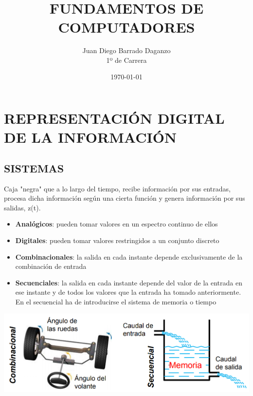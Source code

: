 \documentclass[a4paper,10pt]{book}
\title{FUNDAMENTOS DE COMPUTADORES}
\author{Juan Diego Barrado Daganzo\\1º de Carrera} %
\date{\today}
\begin{document}
\maketitle

\mainmatter
\chapter*{REPRESENTACIÓN DIGITAL DE LA INFORMACIÓN}
\section*{SISTEMAS}
Caja "negra" que a lo largo del tiempo, recibe información por sus entradas, procesa dicha información según una cierta función y genera información por sus salidas, z(t).

\begin{itemize}
\item \textbf{Analógicos}: pueden tomar valores en un espectro continuo de ellos
\item \textbf{Digitales}: pueden tomar valores restringidos a un conjunto discreto
\end{itemize}
\vspace{0.05cm}
\begin{itemize}
\item \textbf{Combinacionales}: la salida en cada instante depende exclusivamente de la combinación de entrada
\item \textbf{Secuenciales}: la salida en cada instante depende del valor de la entrada en ese instante y de todos los valores que la entrada ha tomado anteriormente. En el secuencial ha de introducirse el sistema de memoria o tiempo
\end{itemize}

\begin{center}
\includegraphics[scale=0.45]{secuencial y combinacional}
\end{center}
\end{document}
